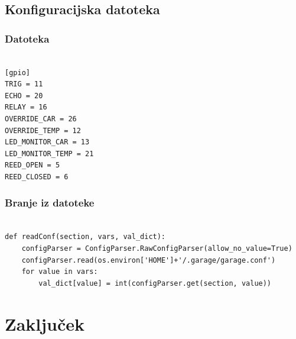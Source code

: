 \documentclass[11pt]{article}
\begin{document}
\subsection{Konfiguracijska datoteka}
\subsubsection{Datoteka}
\begin{verbatim}
  
[gpio]
TRIG = 11
ECHO = 20
RELAY = 16
OVERRIDE_CAR = 26
OVERRIDE_TEMP = 12
LED_MONITOR_CAR = 13
LED_MONITOR_TEMP = 21
REED_OPEN = 5
REED_CLOSED = 6
\end{verbatim}
\subsubsection{Branje iz datoteke}
\begin{verbatim}
  
def readConf(section, vars, val_dict):
    configParser = ConfigParser.RawConfigParser(allow_no_value=True)
    configParser.read(os.environ['HOME']+'/.garage/garage.conf')
    for value in vars:
        val_dict[value] = int(configParser.get(section, value))
\end{verbatim}
\newpage
\section{Zaključek}
\newpage
\clearpage
 
\printglossary[type=\acronymtype]
 
\printglossary[type=main]

\newpage

\begin{flushleft}



\end{flushleft}
\end{document}
